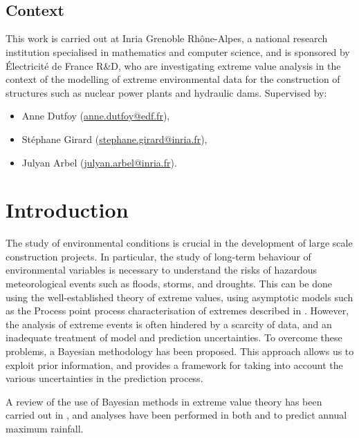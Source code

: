 \documentclass{article}
\title{%
	\vspace{-15mm}\Huge{\hwtitle}\\
	\Large\vspace{1mm}\hwname\\
	\Large\vspace{1mm}\small{\itshape\hwdate}\vspace{-15mm}}
\date{}
\author{}
\begin{document}
%	
\maketitle
%
\subsection*{Context}
%

%
This work is carried out at Inria Grenoble Rhône-Alpes,
a national research institution specialised in mathematics and
computer science,
and is sponsored by Électricité de France R\&D,
who are investigating extreme value analysis
in the context of the modelling
of extreme environmental data
for the construction of structures
such as nuclear power plants and hydraulic dams.
Supervised by:
%
\begin{itemize}
	\item Anne Dutfoy (\href{mailto:anne.dutfoy@edf.fr}{anne.dutfoy@edf.fr}),
	\item Stéphane Girard (\href{mailto:stephane.girard@inria.fr}{stephane.girard@inria.fr}),
	\item Julyan Arbel (\href{mailto:julyan.arbel@inria.fr}{julyan.arbel@inria.fr}).
\end{itemize}
%
\section{Introduction}
%

%
The study of environmental conditions is crucial
in the development of large scale construction projects.
In particular, the study of long-term behaviour
of environmental variables is necessary to understand
the risks of hazardous meteorological events such as
floods, storms, and droughts.
This can be done using the well-established theory of extreme values,
using asymptotic models such as the Process point process characterisation
of extremes described in \cite{coles2001}.
However, the analysis of extreme events is often hindered
by a scarcity of data, and an inadequate treatment
of model and prediction uncertainties.
To overcome these problems, a Bayesian methodology has been proposed.
This approach allows us to exploit prior information,
and provides a framework for taking into account the various uncertainties
in the prediction process.
%

%
A review of the use of Bayesian methods in extreme value theory
has been carried out in \cite{coles1996review},
and analyses have been performed in both
\cite{coles2003} and \cite{coles1996}
to predict annual maximum rainfall.
%
\end{document}
